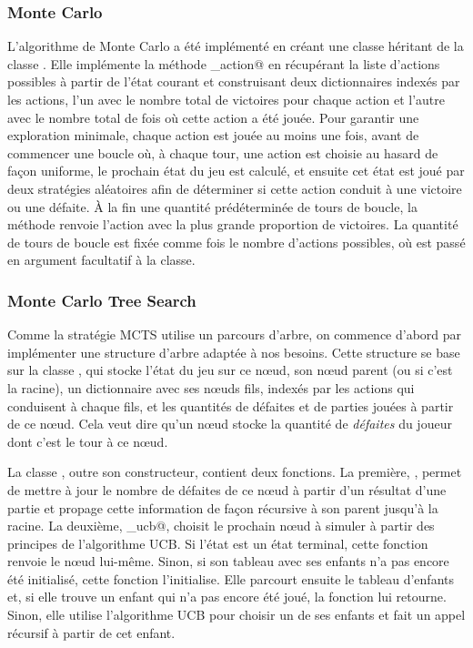 \documentclass[a4paper,12pt]{article}
\begin{document}
\subsubsection{Monte Carlo}

L'algorithme de Monte Carlo a été implémenté en créant une classe \verb@AgentMC@ héritant de la classe \verb@Agent@. Elle implémente la méthode \verb@get_action@ en récupérant la liste d'actions possibles à partir de l'état courant et construisant deux dictionnaires indexés par les actions, l'un avec le nombre total de victoires pour chaque action et l'autre avec le nombre total de fois où cette action a été jouée. Pour garantir une exploration minimale, chaque action est jouée au moins une fois, avant de commencer une boucle où, à chaque tour, une action est choisie au hasard de façon uniforme, le prochain état du jeu est calculé, et ensuite cet état est joué par deux stratégies aléatoires afin de déterminer si cette action conduit à une victoire ou une défaite. À la fin une quantité prédéterminée de tours de boucle, la méthode renvoie l'action avec la plus grande proportion de victoires. La quantité de tours de boucle est fixée comme \verb@n@ fois le nombre d'actions possibles, où \verb@n@ est passé en argument facultatif à la classe.

\subsubsection{Monte Carlo Tree Search}

Comme la stratégie MCTS utilise un parcours d'arbre, on commence d'abord par implémenter une structure d'arbre adaptée à nos besoins. Cette structure se base sur la classe \verb@Noeud@, qui stocke l'état du jeu sur ce n\oe{}ud, son n\oe{}ud parent (ou \verb@None@ si c'est la racine), un dictionnaire avec ses n\oe{}uds fils, indexés par les actions qui conduisent à chaque fils, et les quantités de défaites et de parties jouées à partir de ce n\oe{}ud. Cela veut dire qu'un n\oe{}ud stocke la quantité de \emph{défaites} du joueur dont c'est le tour à ce n\oe{}ud.

La classe \verb@Noeud@, outre son constructeur, contient deux fonctions. La première, \verb@maj@, permet de mettre à jour le nombre de défaites de ce n\oe{}ud à partir d'un résultat d'une partie et propage cette information de façon récursive à son parent jusqu'à la racine. La deuxième, \verb@choix_ucb@, choisit le prochain n\oe{}ud à simuler à partir des principes de l'algorithme UCB. Si l'état est un état terminal, cette fonction renvoie le n\oe{}ud lui-même. Sinon, si son tableau avec ses enfants n'a pas encore été initialisé, cette fonction l'initialise. Elle parcourt ensuite le tableau d'enfants et, si elle trouve un enfant qui n'a pas encore été joué, la fonction lui retourne. Sinon, elle utilise l'algorithme UCB pour choisir un de ses enfants et fait un appel récursif à partir de cet enfant.
\end{document}
